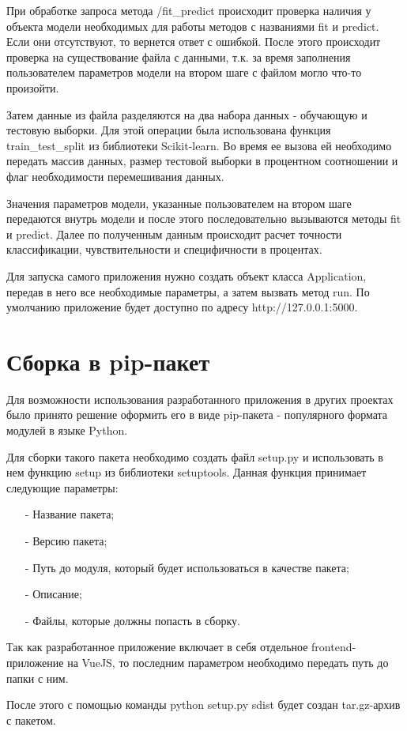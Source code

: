 При обработке запроса метода /fit\_predict происходит проверка наличия у объекта модели необходимых для работы методов с названиями fit и predict. Если они отсутствуют, то вернется ответ с ошибкой. После этого происходит проверка на существование файла с данными, т.к. за время заполнения пользователем параметров модели на втором шаге с файлом могло что-то произойти. 


Затем данные из файла разделяются на два набора данных - обучающую и тестовую выборки. Для этой операции была использована функция train\_test\_split из библиотеки Scikit-learn. Во время ее вызова ей необходимо передать  массив данных, размер тестовой выборки в процентном соотношении и флаг необходимости перемешивания данных. 


Значения параметров модели, указанные пользователем на втором шаге передаются внутрь модели и после этого последовательно вызываются методы fit и predict. Далее по полученным данным происходит расчет точности классификации, чувствительности и специфичности в процентах.


Для запуска самого приложения нужно создать объект класса Application, передав в него все необходимые параметры, а затем вызвать метод run. По умолчанию приложение будет доступно по адресу http://127.0.0.1:5000.

\section{Сборка в pip-пакет}

Для возможности использования разработанного приложения в других проектах было принято решение оформить его в виде pip-пакета - популярного формата модулей в языке Python.


Для сборки такого пакета необходимо создать файл setup.py и использовать в нем функцию setup из библиотеки setuptools. Данная функция принимает следующие параметры:
\begin{itemize}
	\item[-] Название пакета;
	\item[-] Версию пакета;
	\item[-] Путь до модуля, который будет использоваться в качестве пакета;
	\item[-] Описание;
	\item[-] Файлы, которые должны попасть в сборку.
\end{itemize}


Так как разработанное приложение включает в себя отдельное frontend-приложение на VueJS, то последним параметром необходимо передать путь до папки с ним.


После этого с помощью команды python setup.py sdist будет создан tar.gz-архив с пакетом.
